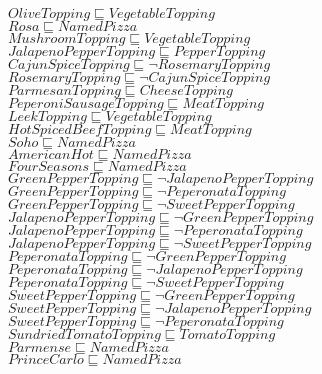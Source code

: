 \documentclass[a4paper,10pt]{article}
\begin{document}
 $OliveTopping \sqsubseteq VegetableTopping$\\ 
 $Rosa \sqsubseteq NamedPizza$\\ 
 $MushroomTopping \sqsubseteq VegetableTopping$\\ 
 $JalapenoPepperTopping \sqsubseteq PepperTopping$\\ 
 $CajunSpiceTopping \sqsubseteq  \lnot RosemaryTopping$\\ 
 $RosemaryTopping \sqsubseteq  \lnot CajunSpiceTopping$\\ 
 $ParmesanTopping \sqsubseteq CheeseTopping$\\ 
 $PeperoniSausageTopping \sqsubseteq MeatTopping$\\ 
 $LeekTopping \sqsubseteq VegetableTopping$\\ 
 $HotSpicedBeefTopping \sqsubseteq MeatTopping$\\ 
 $Soho \sqsubseteq NamedPizza$\\ 
 $AmericanHot \sqsubseteq NamedPizza$\\ 
 $FourSeasons \sqsubseteq NamedPizza$\\ 
 $GreenPepperTopping \sqsubseteq  \lnot JalapenoPepperTopping$\\ 
 $GreenPepperTopping \sqsubseteq  \lnot PeperonataTopping$\\ 
 $GreenPepperTopping \sqsubseteq  \lnot SweetPepperTopping$\\ 
 $JalapenoPepperTopping \sqsubseteq  \lnot GreenPepperTopping$\\ 
 $JalapenoPepperTopping \sqsubseteq  \lnot PeperonataTopping$\\ 
 $JalapenoPepperTopping \sqsubseteq  \lnot SweetPepperTopping$\\ 
 $PeperonataTopping \sqsubseteq  \lnot GreenPepperTopping$\\ 
 $PeperonataTopping \sqsubseteq  \lnot JalapenoPepperTopping$\\ 
 $PeperonataTopping \sqsubseteq  \lnot SweetPepperTopping$\\ 
 $SweetPepperTopping \sqsubseteq  \lnot GreenPepperTopping$\\ 
 $SweetPepperTopping \sqsubseteq  \lnot JalapenoPepperTopping$\\ 
 $SweetPepperTopping \sqsubseteq  \lnot PeperonataTopping$\\ 
 $SundriedTomatoTopping \sqsubseteq TomatoTopping$\\ 
 $Parmense \sqsubseteq NamedPizza$\\ 
 $PrinceCarlo \sqsubseteq NamedPizza$\\ 
\end{document}

